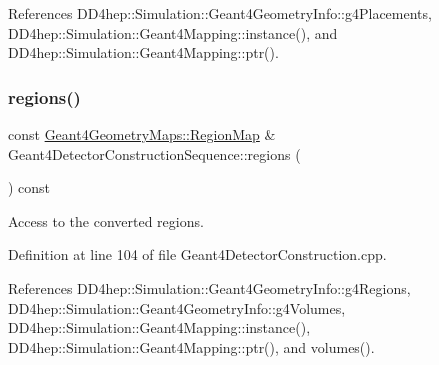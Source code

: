 References D\+D4hep\+::\+Simulation\+::\+Geant4\+Geometry\+Info\+::g4\+Placements, D\+D4hep\+::\+Simulation\+::\+Geant4\+Mapping\+::instance(), and D\+D4hep\+::\+Simulation\+::\+Geant4\+Mapping\+::ptr().

\hypertarget{class_d_d4hep_1_1_simulation_1_1_geant4_detector_construction_sequence_a1530c4fc7b3c80d7bf2d30be6e873b85}{}\label{class_d_d4hep_1_1_simulation_1_1_geant4_detector_construction_sequence_a1530c4fc7b3c80d7bf2d30be6e873b85} 
\subsubsection{\texorpdfstring{regions()}{regions()}}
{\footnotesize\ttfamily const \hyperlink{namespace_d_d4hep_1_1_simulation_1_1_geant4_geometry_maps_afb7f77d7599fee831bfb2341123e8377}{Geant4\+Geometry\+Maps\+::\+Region\+Map} \& Geant4\+Detector\+Construction\+Sequence\+::regions (\begin{DoxyParamCaption}{ }\end{DoxyParamCaption}) const}



Access to the converted regions. 



Definition at line 104 of file Geant4\+Detector\+Construction.\+cpp.



References D\+D4hep\+::\+Simulation\+::\+Geant4\+Geometry\+Info\+::g4\+Regions, D\+D4hep\+::\+Simulation\+::\+Geant4\+Geometry\+Info\+::g4\+Volumes, D\+D4hep\+::\+Simulation\+::\+Geant4\+Mapping\+::instance(), D\+D4hep\+::\+Simulation\+::\+Geant4\+Mapping\+::ptr(), and volumes().

\hypertarget{class_d_d4hep_1_1_simulation_1_1_geant4_detector_construction_sequence_ab449db11def741eba65c3fbff0a0e176}{}\label{class_d_d4hep_1_1_simulation_1_1_geant4_detector_construction_sequence_ab449db11def741eba65c3fbff0a0e176} 
